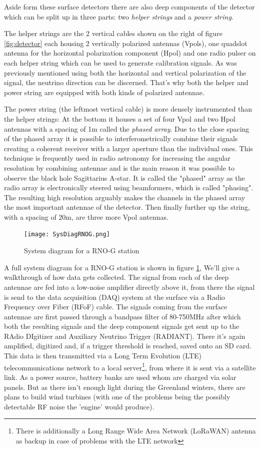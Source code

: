 Aside form these surface detectors there are also deep components of the
detector which can be split up in three parts: two \textit{helper strings} and
a \textit{power string}.

The helper strings are the 2 vertical cables shown on the right of figure
\ref{fig:detector} each housing 2 vertically polarized antennas (Vpols), one
quadslot antenna for the horizontal polarization component (Hpol) and one radio
pulser on each helper string which can be used to generate calibration signals.
As was previously mentioned using both the horizontal and vertical polarization of the
signal, the neutrino direction can be discerned. That's why both the helper and power 
string are equipped with both kinds of polarized antennae.

The power string (the leftmost vertical cable) is more densely instrumented
than the helper strings: At the bottom it houses a set of four Vpol and two
Hpol antennas with a spacing of 1m called the \textit{phased array}\cite{Allison_2019}. 
Due to the close spacing of the phased array it is possible to
interferometrically combine their signals creating a coherent receiver with a 
larger aperture than the individual ones. This technique is frequently used in radio astronomy
for increasing the angular resolution by combining antennae and is the main
reason it was possible to observe the black hole Sagittarius A-star\cite{SqrA*}.
It is called the "phased" array as the radio array is electronically
steered using beamformers, which is called "phasing".
The resulting high resolution arguably makes the channels in the phased array the most important 
antennae of the detector.
Then finally further up the string, with a spacing of 20m, are three more Vpol antennas.
\begin{figure}
  \centering
  \texttt{[image: SysDiagRNOG.png]}
  \caption{System diagram for a RNO-G station }
  \label{fig:SysDiag}
\end{figure}

A full system diagram for a RNO-G station is shown in figure \ref{fig:SysDiag},
We'll give a walkthrough of how data gets collected.  The signal from each of
the deep antennae are fed into a low-noise amplifier directly above it\cite{Aguilar_2021}, from
there the signal is send to the data acquisition (DAQ) system at the surface
via a Radio Frequency over Fiber (RFoF) cable.  The signals coming from the
surface antennae are first passed through a bandpass filter of
80-750MHz after which both the resulting signals and the deep component signals get sent
up to the RAdio DIgitizer and Auxiliary Neutrino Trigger (RADIANT). There it's
again amplified, digitized and, if a trigger threshold is reached, saved onto
an SD card. This data is then transmitted via a Long Term Evolution (LTE)
telecommunications network to a local server\footnote{There is additionally a
Long Range Wide Area Network (LoRaWAN) antenna as backup in case of problems
with the LTE network}, from where it is sent via a satellite link.
As a power source, battery banks are used whom are charged via solar panels.
But as there isn't enough light during the Greenland winters, there are plans to
build wind turbines (with one of the problems being the possibly detectable RF
noise the 'engine' would produce).

